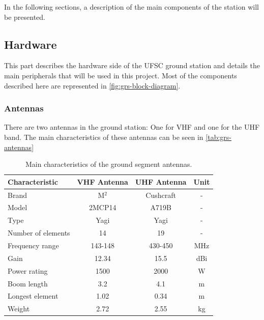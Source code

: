 In the following sections, a description of the main components of the station will be presented.

\subsection{Hardware}

This part describes the hardware side of the UFSC ground station and details the main peripherals that will be used in this project. Most of the components described here are represented in \autoref{fig:grs-block-diagram}.

\subsubsection{Antennas}

There are two antennas in the ground station: One for VHF and one for the UHF band. The main characteristics of these antennas can be seen in \autoref{tab:grs-antennas}

\begin{table}[ht]
    \centering
    \begin{tabular}{lccc}
        \toprule[1.5pt]
        \textbf{Characteristic} & \textbf{VHF Antenna}  & \textbf{UHF Antenna}  & \textbf{Unit} \\
        \midrule
        Brand                   & M$^{2}$               & Cushcraft             & - \\
        Model                   & 2MCP14                & A719B                 & - \\
        Type                    & Yagi                  & Yagi                  & - \\
        Number of elements      & 14                    & 19                    & - \\
        Frequency range         & 143-148               & 430-450               & MHz \\
        Gain                    & 12.34                 & 15.5                  & dBi \\
        Power rating            & 1500                  & 2000                  & W \\
        Boom length             & 3.2                   & 4.1                   & m \\
        Longest element         & 1.02                  & 0.34                  & m \\
        Weight                  & 2.72                  & 2.55                  & kg \\
        \bottomrule[1.5pt]
    \end{tabular}
    \caption{Main characteristics of the ground segment antennas.}
    \label{tab:grs-antennas}
\end{table}

